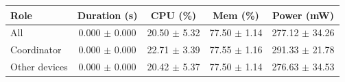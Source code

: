 \begin{tabular}{lcccc}
\hline
\textbf{Role} & \textbf{Duration (s)} & \textbf{CPU (\%)} & \textbf{Mem (\%)} & \textbf{Power (mW)} \\
\hline
All & 0.000 $\pm$ 0.000 & 20.50 $\pm$ 5.32 & 77.50 $\pm$ 1.14 & 277.12 $\pm$ 34.26 \\
Coordinator & 0.000 $\pm$ 0.000 & 22.71 $\pm$ 3.39 & 77.55 $\pm$ 1.16 & 291.33 $\pm$ 21.78 \\
Other devices & 0.000 $\pm$ 0.000 & 20.42 $\pm$ 5.37 & 77.50 $\pm$ 1.14 & 276.63 $\pm$ 34.53 \\
\hline
\end{tabular}
